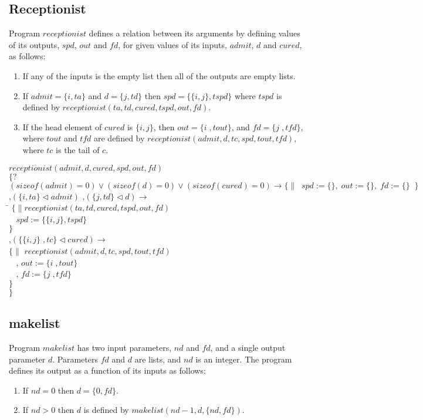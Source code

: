 \subsection{Receptionist}
Program $receptionist$ defines a relation between its arguments by
defining values of its outputs, $spd$, $out$ and $fd$, for given values
of its inputs, $admit$, $d$ and $cured$, as follows:
\begin{enumerate}
   \item If any of the inputs is the empty list then all of the
         outputs are empty lists.
   \item If $admit =\{ i , ta \} $ and $d = \{ j , td \}$ 
         then $spd = \{ \{i,j\} , tspd \} $
         where $tspd$ is defined by 
         $receptionist(ta, td, cured, tspd, out, fd)$.
   \item If the head element of $cured$ is $\{i,j\}$, then
          $out = \{ i \; , tout \}$, and $fd =  \{ j \; , tfd \}$,
          where $tout$ and $tfd$ are defined by 
          $receptionist(admit,d,tc,spd,tout,tfd)$, where $tc$ is the
          tail of $c$.
\end{enumerate}
\begin{tabbing}
$receptionist(admit,d,cured,spd,out,fd)$ \\
$\{?$ 
$(sizeof(admit) = 0) \vee (sizeof(d) = 0) \vee (sizeof(cured) = 0) \rightarrow
\{\| \; \; spd := \{\}, \; out := \{\}, \; fd := \{\} \; \; \}$ \\
,$(\{ i , ta \} \lhd admit)$ 
,$(\{ j , td \} \lhd d) \rightarrow$ \\
\hspace{1cm} \= $\{ \| receptionist(ta, td, cured, tspd, out, fd)$ \\
\> $\; \; $ $spd := \{ \{i,j\} , tspd \} $\\
\> $\}$ \\
,$(\{ \{i,j\} \; , tc \} \lhd cured) \rightarrow$ \\
\> $\{ \| $ $receptionist(admit,d,tc,spd,tout,tfd)$ \\
\> $\; \;$  , $out := \{ i \; , tout \}$ \\
\> $\; \;$ , $fd :=  \{ j \; , tfd \}$ \\
\> $\}$ \\
$\}$
\end{tabbing}
\subsection{makelist}
Program $makelist$ has two input parameters, $nd$ and $fd$, and a single
output parameter $d$.
Parameters $fd$ and $d$ are lists, and $nd$ is an integer.
The program defines its output as a function of its inputs as follows:
\begin{enumerate}
   \item If $nd = 0$ then $d = \{0,fd\}$.
   \item If $nd > 0$ then $d$ is defined by $makelist(nd-1,d,\{nd,fd\})$.
\end{enumerate}

